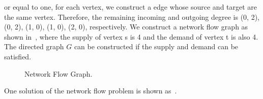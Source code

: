 \documentclass{../../cls/sig-alternate-05-2015}
\begin{document}
or equal to one, for each vertex,
we construct a edge whose source and target are the same vertex.
Therefore, the remaining incoming and outgoing degree is (0, 2), (0, 2), (1, 0), (1, 0),
(2, 0), respectively.
We construct a network flow graph as shown in~,
where the supply of vertex s is 4 and the demand of vertex t is also 4.
The directed graph $G$ can be constructed if the supply and demand can be satisfied.
\begin{figure}[H]
    \caption{Network Flow Graph.}
    \label{fig:5:2:1}
\end{figure}
One solution of the network flow problem is shown as~.
\end{document}
